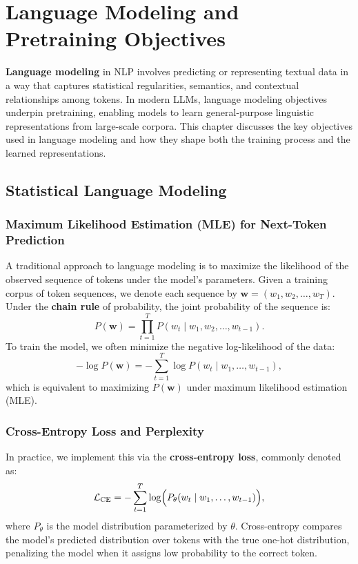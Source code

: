 \chapter{Language Modeling and Pretraining Objectives}
\label{chap:lm_pretraining}

\noindent
\textbf{Language modeling} in NLP involves predicting or representing textual data in a way that captures statistical regularities, semantics, and contextual relationships among tokens. In modern LLMs, language modeling objectives underpin pretraining, enabling models to learn general-purpose linguistic representations from large-scale corpora. This chapter discusses the key objectives used in language modeling and how they shape both the training process and the learned representations.

\section{Statistical Language Modeling}
\label{sec:stat_lm}

\subsection{Maximum Likelihood Estimation (MLE) for Next-Token Prediction}
\noindent
A traditional approach to language modeling is to maximize the likelihood of the observed sequence of tokens under the model’s parameters. Given a training corpus of token sequences, we denote each sequence by \(\mathbf{w} = (w_1, w_2, \ldots, w_T)\). Under the \textbf{chain rule} of probability, the joint probability of the sequence is:
\[
P(\mathbf{w}) = \prod_{t=1}^{T} P(w_t \mid w_1, w_2, \ldots, w_{t-1}).
\]
To train the model, we often minimize the negative log-likelihood of the data:
\[
-\log P(\mathbf{w}) = -\sum_{t=1}^{T} \log P(w_t \mid w_1, \ldots, w_{t-1}),
\]
which is equivalent to maximizing \(P(\mathbf{w})\) under maximum likelihood estimation (MLE). 

\subsection{Cross-Entropy Loss and Perplexity}
\noindent
In practice, we implement this via the \textbf{cross-entropy loss}, commonly denoted as:
\[
\mathcal{L}_\text{CE} = -\sum_{t=1}^{T} \log \Bigl( P_{\theta}(w_t \mid w_1, \ldots, w_{t-1}) \Bigr),
\]
where \(P_{\theta}\) is the model distribution parameterized by \(\theta\). Cross-entropy compares the model’s predicted distribution over tokens with the true one-hot distribution, penalizing the model when it assigns low probability to the correct token.

